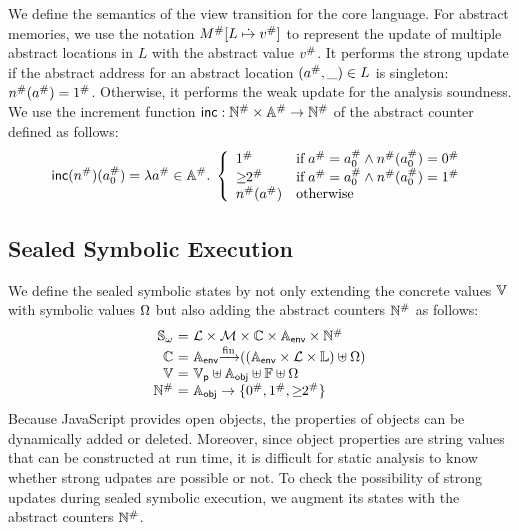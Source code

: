 We define the semantics of the view transition for the core language.  For abstract
memories, we use the notation ${M}^{\#}[L \;\dot{\mapsto}\; {v}^{\#}]$ to represent the
update of multiple abstract locations in $L$ with the abstract value ${v}^{\#}$.
It performs the strong update if the abstract address for an abstract location
$({a}^{\#}, \_) \in L$ is singleton: ${n}^{\#}({a}^{\#}) = {1}^{\#}$.
Otherwise, it performs the weak update for the analysis soundness.  We use
the increment function $\textsf{inc}: {\mathbb{N}}^{\#} \times {\mathbb{A}}^{\#} \rightarrow
{\mathbb{N}}^{\#}$ of the abstract counter defined as follows:
\[
  \textsf{inc}({n}^{\#})({a}^{\#}_0) = \lambda {a}^{\#} \in {\mathbb{A}}^{\#}. \; \left\{
    \begin{array}{ll}
      {1}^{\#} & \text{if} \; {a}^{\#} = {a}^{\#}_0 \wedge
      {n}^{\#}({a}^{\#}_0) = {0}^{\#}\\
      {\geq\!\!2}^{\#} & \text{if} \; {a}^{\#} = {a}^{\#}_0 \wedge
      {n}^{\#}({a}^{\#}_0) = {1}^{\#}\\
      {n}^{\#}({a}^{\#}) & \text{otherwise}
    \end{array}
  \right.
\]


\subsection{Sealed Symbolic Execution}

We define the sealed symbolic states by not only extending the concrete values
$\mathbb{V}$ with symbolic values $\Omega$ but also adding the abstract counters
${\mathbb{N}}^{\#}$ as follows:
\[
  \begin{array}{r@{~}c@{~}l}
    \symbstset &=& \labset \times \memset \times \ctxtset \times \eaddrset
    \times \abscountset\\
    \ctxtset &=& \eaddrset \finmap ((\eaddrset \times \labset \times \locset)
    \uplus \symbset)\\
    \valset &=& \pvalset \uplus \oaddrset \uplus \fvalset \uplus \symbset\\
    \abscountset &=& \oaddrset \rightarrow \{ \abszero, \absone, \absmany \}\\
  \end{array}
\]
Because JavaScript provides open objects, the properties of objects can be dynamically added or deleted.
Moreover, since object properties are string values that can be constructed at run time,
it is difficult for static analysis to know whether strong udpates are possible or not.
To check the possibility of strong updates during sealed symbolic execution,
we augment its states with the abstract counters ${\mathbb{N}}^{\#}$.

